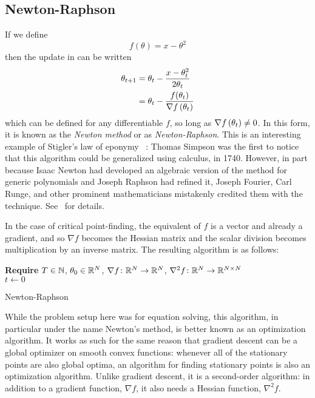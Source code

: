 \documentclass[../../thesis.tex]{subfiles}
\begin{document}
\subsection{Newton-Raphson}

If we define
\begin{equation}
	f(\theta) = x - \theta^2
\end{equation}
\noindent then the update in 
can be written
\begin{align}
	\theta_{t+1} &= \theta_t - \frac{x - \theta_t^2}{2\theta_t}\\
	&= \theta_t - \frac{f(\theta_t)}{\grad{f}{\theta_t}}\equationlabel{newton-iter}
\end{align}
\noindent which can be defined for any differentiable $f$,
so long as $\nabla f\left(\theta_t\right)\neq 0$.
In this form, it is known as the \emph{Newton method}
or as \emph{Newton-Raphson}.
This is an interesting example of Stigler's law of eponymy%
~\cite{stigler1980}:
Thomas Simpson was the first to notice that
this algorithm could be generalized using calculus,
in 1740.
However, in part because Isaac Newton had developed an
algebraic version of the method
for generic polynomials and Joseph Raphson had refined it,
Joseph Fourier, Carl Runge, and other
prominent mathematicians mistakenly credited them with the technique.
See~\cite{kollerstrom1992} for details.

In the case of critical point-finding,
the equivalent of $f$ is a vector and already a gradient,
and so $\nabla f$ becomes the Hessian matrix
and the scalar division becomes multiplication by an inverse matrix.
The resulting algorithm is as follows:
\\
\begin{algorithm}[H]
    \SetAlgoLined{}
    \textbf{Require}
    $T\in \mathbb{N}$, $\theta_0 \in \mathbb{R}^N$,
    $\nabla{f}\colon\mathbb{R}^N\to\mathbb{R}^N$,
    $\nabla^2{f}\colon\mathbb{R}^N\to\mathbb{R}^{N\times N}$\\
    $t \leftarrow 0$\\
    \caption{Newton-Raphson}
\end{algorithm}

While the problem setup here was for equation solving,
this algorithm, in particular under the name Newton's method,
is better known as an optimization algorithm.
It works as such for the same reason that gradient descent
can be a global optimizer on smooth convex functions:
whenever all of the stationary points
are also global optima,
an algorithm for finding stationary points is also
an optimization algorithm.
Unlike gradient descent,
it is a second-order algorithm:
in addition to a gradient function, $\nabla f$,
it also needs a Hessian function, $\nabla^2 f$.
\end{document}
